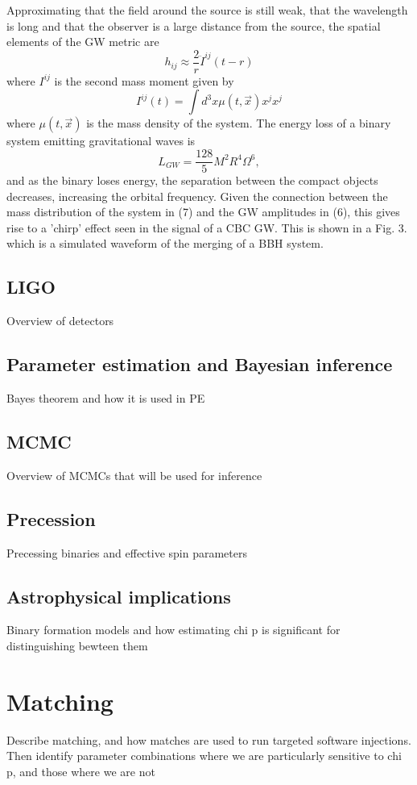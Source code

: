 \documentclass[]{article}
\begin{document}
Approximating that the field around the source is still weak, that the wavelength is long and that the observer is a large distance from the source, the spatial elements of the GW metric are
\begin{equation}
h_{ij}\approx\frac{2}{r}\ddot{I}^{ij}(t-r)
\end{equation}
where $I^{ij}$ is the second mass moment given by
\begin{equation}
I^{ij}(t)=\int d^3x\mu(t,\vec{x})x^jx^j
\end{equation}
where $\mu(t,\vec{x})$ is the mass density of the system. The energy loss of a binary system emitting gravitational waves is
\begin{equation}
L_{GW}=\frac{128}{5}M^2R^4\Omega^6,
\end{equation}
and as the binary loses energy, the separation between the compact objects decreases, increasing the orbital frequency. Given the connection between the mass distribution of the system in (7) and the GW amplitudes in (6), this gives rise to a 'chirp' effect seen in the signal of a CBC GW. This is shown in a Fig. 3. which is a simulated waveform of the merging of a BBH system.
\subsection{LIGO}
Overview of detectors
\subsection{Parameter estimation and Bayesian inference}
Bayes theorem and how it is used in PE
\subsection{MCMC}
Overview of MCMCs that will be used for inference
\subsection{Precession}
Precessing binaries and effective spin parameters
\subsection{Astrophysical implications}
Binary formation models and how estimating chi p is significant for distinguishing bewteen them

\section{Matching}
Describe matching, and how matches are used to run targeted software injections.
Then identify parameter combinations where we are particularly sensitive to chi p, and those where we are not
\end{document}
